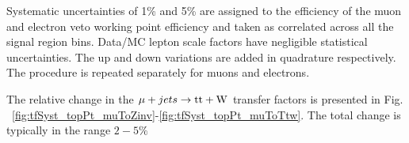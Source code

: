 Systematic uncertainties of 1\% and 5\% are assigned to the efficiency of the muon and electron veto working point efficiency and taken as correlated across all the signal region bins. 
Data/MC lepton scale factors have negligible statistical uncertainties. 
The up and down variations are added in quadrature respectively. 
The procedure is repeated separately for muons and
electrons. 

The relative change in the $\mu + jets \rightarrow \mathrm{tt+W}$ transfer factors 
is presented in Fig.
~\ref{fig:tfSyst_topPt_muToZinv}-\ref{fig:tfSyst_topPt_muToTtw}. The
total change is typically in the range $2-5\%$

\begin{figure}[!h]
  \centering
   ~~
  \\
\end{figure}
